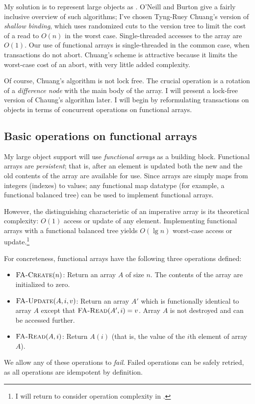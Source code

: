 My solution is to represent large objects as .  O'Neill and Burton \cite{ONeillBu97} give a fairly
inclusive overview of such algorithms; I've chosen Tyng-Ruey Chuang's
version \cite{Chuang94} of \emph{shallow binding}, which uses
randomized cuts to the version tree to limit the cost of a read to
$O(n)$ in the worst case.  Single-threaded accesses to the array are
$O(1)$.  Our use of functional arrays is single-threaded in the common
case, when transactions do not abort.  Chuang's scheme is attractive
because it limits the worst-case cost of an abort, with very little
added complexity.

Of course, Chuang's algorithm is not lock free.
The crucial operation is a rotation of a \emph{difference node} with the
main body of the array.  I will present a lock-free version of
Chaung's algorithm later.  I will begin by
reformulating transactions on objects in terms of concurrent
operations on functional arrays.

\subsection{Basic operations on functional arrays}
My large object support will use \emph{functional arrays} as
a building block.  Functional arrays are \emph{persistent}; that is,
after an element is updated both the new and the old contents of the
array are available for use.  Since arrays are simply maps from
integers (indexes) to values; any functional map datatype (for
example, a functional balanced tree) can be used to implement
functional arrays.

However, the distinguishing characteristic of an imperative array is its
theoretical complexity: $O(1)$ access or update of any element.
Implementing functional arrays with a functional balanced tree yields
$O(\lg n)$ worst-case access or update.\footnote{I will return to
consider operation complexity in .}

For concreteness, functional arrays have the following three
operations defined:
\begin{itemize}
\item $\text{\sc FA-Create}(n)$: Return an array $A$ of size $n$.  The
  contents of the array are initialized to zero.
\item $\text{\sc FA-Update}(A, i, v)$: Return an array $A'$ which is
  functionally identical to array $A$ except that
  $\text{\sc FA-Read}(A', i)=v$.
  Array $A$ is not destroyed and can be accessed further.
\item $\text{\sc FA-Read}(A, i)$: Return $A(i)$ (that is, the
  value of the $i$th element of array $A$).
\end{itemize}
We allow any of these operations to \emph{fail}.  Failed operations
can be safely retried, as all operations are idempotent by definition.

